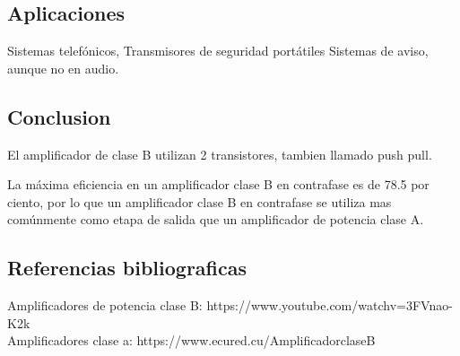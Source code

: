 \documentclass[12pt,a4paper]{article}
\begin{document}
\subsection{Aplicaciones}
Sistemas telefónicos,
Transmisores de seguridad portátiles
Sistemas de aviso, aunque no en audio.

\subsection{Conclusion}
El amplificador de clase B utilizan 2 transistores, tambien llamado push pull.

La máxima eficiencia en un amplificador clase B en contrafase es de 78.5 por ciento, por lo que un amplificador clase B en contrafase se utiliza mas comúnmente como etapa de salida que un amplificador de potencia clase A.

\subsection{Referencias bibliograficas}
Amplificadores de potencia clase B: https://www.youtube.com/watchv=3FVnao-K2k\\
Amplificadores clase a: https://www.ecured.cu/AmplificadorclaseB
\end{document}
